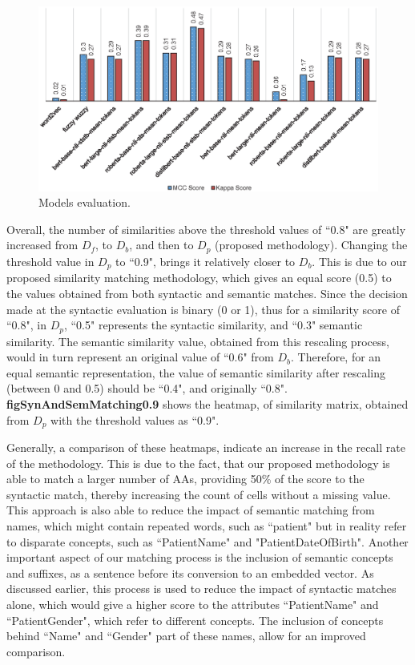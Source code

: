 \documentclass{ieeeaccess}
\begin{document}
\begin{figure}[t!]
	\centering
	\includegraphics[scale=0.83]{evaluation}
	\caption{Models evaluation.}
	\label{fig:evaluation}
\end{figure}



Overall, the number of similarities above the threshold values of ``0.8" are greatly increased from $D_f$, to $D_b$, and then to $D_p$ (proposed methodology). Changing the threshold value in $D_p$ to ``0.9", brings it relatively closer to $D_b$. This is due to our proposed similarity matching methodology, which gives an equal score (0.5) to the values obtained from both syntactic and semantic matches. Since the decision made at the syntactic evaluation is binary (0 or 1), thus for a similarity score of ``0.8", in $D_p$, ``0.5" represents the syntactic similarity, and ``0.3" semantic similarity. The semantic similarity value, obtained from this rescaling process, would in turn represent an original value of ``0.6" from $D_b$. Therefore, for an equal semantic representation, the value of semantic similarity after rescaling (between 0 and 0.5) should be ``0.4", and originally ``0.8". \textbf{figSynAndSemMatching0.9} shows the heatmap, of similarity matrix, obtained from $D_p$ with the threshold values as ``0.9".

Generally, a comparison of these heatmaps, indicate an increase in the recall rate of the methodology. This is due to the fact, that our proposed methodology is able to match a larger number of AAs, providing 50\% of the score to the syntactic match, thereby increasing the count of cells without a missing value. This approach is also able to reduce the impact of semantic matching from names, which might contain repeated words, such as ``patient" but in reality refer to disparate concepts, such as ``PatientName" and "PatientDateOfBirth". Another important aspect of our matching process is the inclusion of semantic concepts and suffixes, as a sentence before its conversion to an embedded vector. As discussed earlier, this process is used to reduce the impact of syntactic matches alone, which would give a higher score to the attributes ``PatientName" and ``PatientGender", which refer to different concepts. The inclusion of concepts behind ``Name" and ``Gender" part of these names, allow for an improved comparison. 
\end{document}
